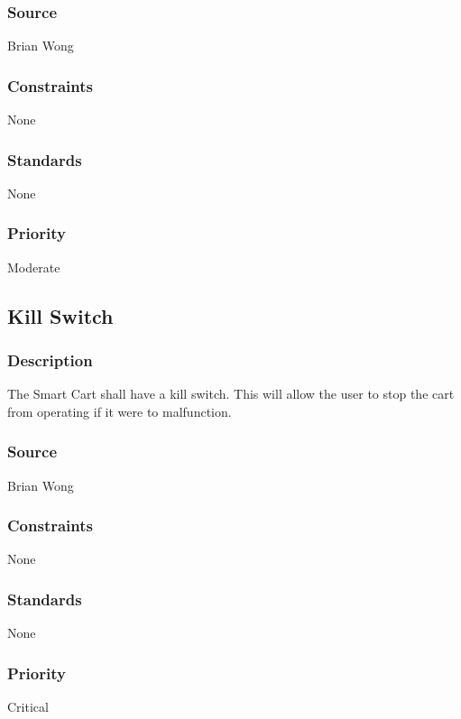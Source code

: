 \subsubsection{Source}
Brian Wong
\subsubsection{Constraints}
None
\subsubsection{Standards}
None
\subsubsection{Priority}
Moderate

\subsection{Kill Switch}
\subsubsection{Description}
The Smart Cart shall have a kill switch. This will allow the user to stop the cart from operating if it were to malfunction.
\subsubsection{Source}
Brian Wong
\subsubsection{Constraints}
None
\subsubsection{Standards}
None
\subsubsection{Priority}
Critical
